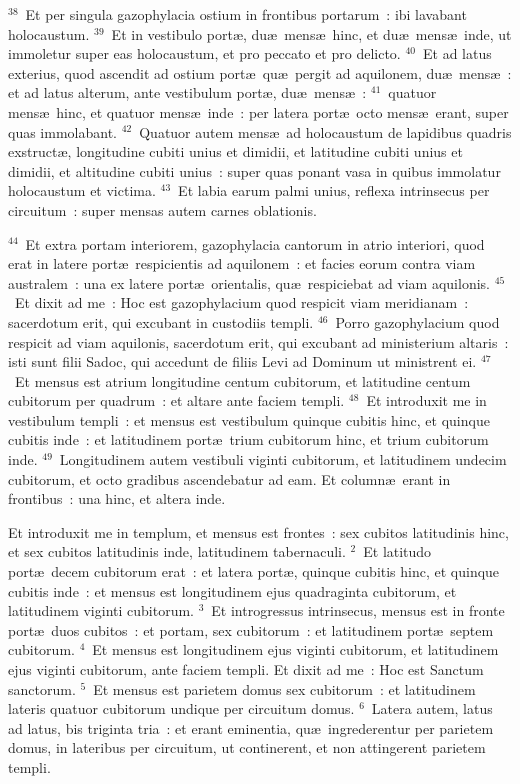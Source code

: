 ${}^{38}$~Et per singula gazophylacia ostium in frontibus portarum~: ibi lavabant holocaustum.
${}^{39}$~Et in vestibulo port\ae , du\ae\ mens\ae\ hinc, et du\ae\ mens\ae\ inde, ut immoletur super eas holocaustum, et pro peccato et pro delicto.
${}^{40}$~Et ad latus exterius, quod ascendit ad ostium port\ae\ qu\ae\ pergit ad aquilonem, du\ae\ mens\ae~: et ad latus alterum, ante vestibulum port\ae , du\ae\ mens\ae~:
${}^{41}$~quatuor mens\ae\ hinc, et quatuor mens\ae\ inde~: per latera port\ae\ octo mens\ae\ erant, super quas immolabant.
${}^{42}$~Quatuor autem mens\ae\ ad holocaustum de lapidibus quadris exstruct\ae , longitudine cubiti unius et dimidii, et latitudine cubiti unius et dimidii, et altitudine cubiti unius~: super quas ponant vasa in quibus immolatur holocaustum et victima.
${}^{43}$~Et labia earum palmi unius, reflexa intrinsecus per circuitum~: super mensas autem carnes oblationis.


${}^{44}$~Et extra portam interiorem, gazophylacia cantorum in atrio interiori, quod erat in latere port\ae\ respicientis ad aquilonem~: et facies eorum contra viam australem~: una ex latere port\ae\ orientalis, qu\ae\ respiciebat ad viam aquilonis.
${}^{45}$~Et dixit ad me~: Hoc est gazophylacium quod respicit viam meridianam~: sacerdotum erit, qui excubant in custodiis templi.
${}^{46}$~Porro gazophylacium quod respicit ad viam aquilonis, sacerdotum erit, qui excubant ad ministerium altaris~: isti sunt filii Sadoc, qui accedunt de filiis Levi ad Dominum ut ministrent ei.
${}^{47}$~Et mensus est atrium longitudine centum cubitorum, et latitudine centum cubitorum per quadrum~: et altare ante faciem templi.
${}^{48}$~Et introduxit me in vestibulum templi~: et mensus est vestibulum quinque cubitis hinc, et quinque cubitis inde~: et latitudinem port\ae\ trium cubitorum hinc, et trium cubitorum inde.
${}^{49}$~Longitudinem autem vestibuli viginti cubitorum, et latitudinem undecim cubitorum, et octo gradibus ascendebatur ad eam. Et column\ae\ erant in frontibus~: una hinc, et altera inde.

\lettrine[lines=10,image=true,loversize=0.05,lraise=-0.03]{E}{}t introduxit me in templum, et mensus est frontes~: sex cubitos latitudinis hinc, et sex cubitos latitudinis inde, latitudinem tabernaculi.
${}^{2}$~Et latitudo port\ae\ decem cubitorum erat~: et latera port\ae , quinque cubitis hinc, et quinque cubitis inde~: et mensus est longitudinem ejus quadraginta cubitorum, et latitudinem viginti cubitorum.
${}^{3}$~Et introgressus intrinsecus, mensus est in fronte port\ae\ duos cubitos~: et portam, sex cubitorum~: et latitudinem port\ae\ septem cubitorum.
${}^{4}$~Et mensus est longitudinem ejus viginti cubitorum, et latitudinem ejus viginti cubitorum, ante faciem templi. Et dixit ad me~: Hoc est Sanctum sanctorum.
${}^{5}$~Et mensus est parietem domus sex cubitorum~: et latitudinem lateris quatuor cubitorum undique per circuitum domus.
${}^{6}$~Latera autem, latus ad latus, bis triginta tria~: et erant eminentia, qu\ae\ ingrederentur per parietem domus, in lateribus per circuitum, ut continerent, et non attingerent parietem templi.



